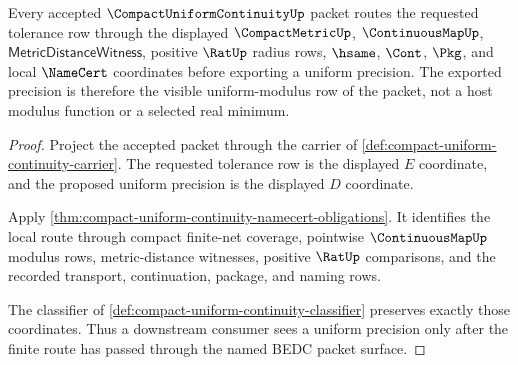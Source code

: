 \begin{theorem}
\label{thm:compact-uniform-continuity-root-uniform-modulus-row}
Every accepted $\CompactUniformContinuityUp$ packet routes the requested tolerance row through the displayed $\CompactMetricUp$, $\ContinuousMapUp$, $\mathsf{MetricDistanceWitness}$, positive $\RatUp$ radius rows, $\hsame$, $\Cont$, $\Pkg$, and local $\NameCert$ coordinates before exporting a uniform precision. The exported precision is therefore the visible uniform-modulus row of the packet, not a host modulus function or a selected real minimum.
\end{theorem}
\begin{proof}
Project the accepted packet through the carrier of \autoref{def:compact-uniform-continuity-carrier}. The requested tolerance row is the displayed $E$ coordinate, and the proposed uniform precision is the displayed $D$ coordinate.

Apply \autoref{thm:compact-uniform-continuity-namecert-obligations}. It identifies the local route through compact finite-net coverage, pointwise $\ContinuousMapUp$ modulus rows, metric-distance witnesses, positive $\RatUp$ comparisons, and the recorded transport, continuation, package, and naming rows.

The classifier of \autoref{def:compact-uniform-continuity-classifier} preserves exactly those coordinates. Thus a downstream consumer sees a uniform precision only after the finite route has passed through the named BEDC packet surface.
\end{proof}

